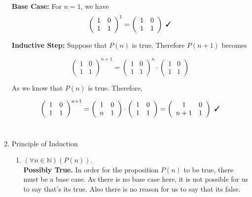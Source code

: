 \documentclass[11pt]{article}
\newcommand{\cmark}{\ding{51}}%
\begin{document}
\begin{enumerate}
		\textbf{Base Case:} For $n = 1$, we have 
		$$\left(\begin{array}{cc}1&0\\1&1\end{array}\right)^1 = \left(\begin{array}{cc}1&0\\1&1\end{array}\right) \text{  \cmark}$$
		
		\textbf{Inductive Step:} Suppose that $P(n)$ is true. Therefore $P(n + 1)$ becomes 
		
		$$\left(\begin{array}{cc}1&0\\1&1\end{array}\right)^{n+1} = \left(\begin{array}{cc}1&0\\1&1\end{array}\right)^n \cdot \left(\begin{array}{cc}1&0\\1&1\end{array}\right) $$
		
		As we know that $P(n)$ is true. Therefore, 
		
		$$\left(\begin{array}{cc}1&0\\1&1\end{array}\right)^{n+1} = \left(\begin{array}{cc}1&0\\n&1\end{array}\right) \cdot \left(\begin{array}{cc}1&0\\1&1\end{array}\right) = \left(\begin{array}{cc}1&0\\{n+1}&1\end{array}\right) \textbf{  \cmark}$$		\\
		
		\item Principle of Induction
		
			\begin{enumerate}
					
				\item $(\forall n \in \mathbb{N} ) (P(n))$. \\
				\textbf{Possibly True.} In order for the proposition $P(n)$ to be true, there must be a base case. As there is no base case here, it is not possible for us to say that's its true. Also there is no reason for us to say that its false.  


\end{enumerate}
\end{enumerate}
\end{document}
